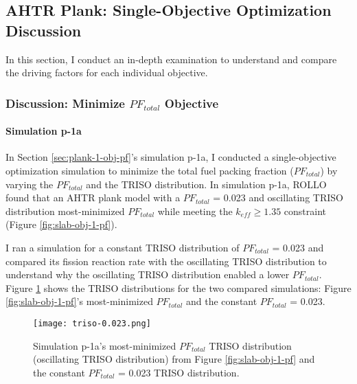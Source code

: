 \subsection{AHTR Plank: Single-Objective Optimization Discussion}
\label{sec:plank-discussion-single}
In this section, I conduct an in-depth examination to understand and compare the 
driving factors for each individual objective. 

\subsubsection{Discussion: Minimize $PF_{total}$ Objective}
\paragraph{Simulation p-1a}
In Section \ref{sec:plank-1-obj-pf}'s simulation p-1a, I conducted a single-objective 
optimization simulation to minimize the total fuel packing fraction ($PF_{total}$) by 
varying the $PF_{total}$ and the TRISO distribution. 
In simulation p-1a, \gls{ROLLO} found that an \gls{AHTR} plank model with a
$PF_{total}$ = 0.023 and oscillating TRISO distribution most-minimized 
$PF_{total}$ while meeting the $k_{eff} \geq 1.35$ constraint 
(Figure \ref{fig:slab-obj-1-pf}). 

I ran a simulation for a constant TRISO distribution of $PF_{total}$ = 0.023 and 
compared its fission reaction rate with the oscillating TRISO distribution 
to understand why the oscillating TRISO distribution enabled a lower $PF_{total}$. 
Figure \ref{fig:triso-0.023} shows the TRISO distributions for the two compared 
simulations: Figure \ref{fig:slab-obj-1-pf}'s most-minimized $PF_{total}$ 
and the constant $PF_{total}$ = 0.023. 
\begin{figure}[htbp!]
    \centering
    \texttt{[image: triso-0.023.png]} 
    \caption{Simulation p-1a's most-minimized $PF_{total}$ TRISO distribution 
    (oscillating TRISO distribution) from Figure \ref{fig:slab-obj-1-pf} and the 
    constant $PF_{total}$ = 0.023 TRISO distribution.}
    \label{fig:triso-0.023}
\end{figure}

